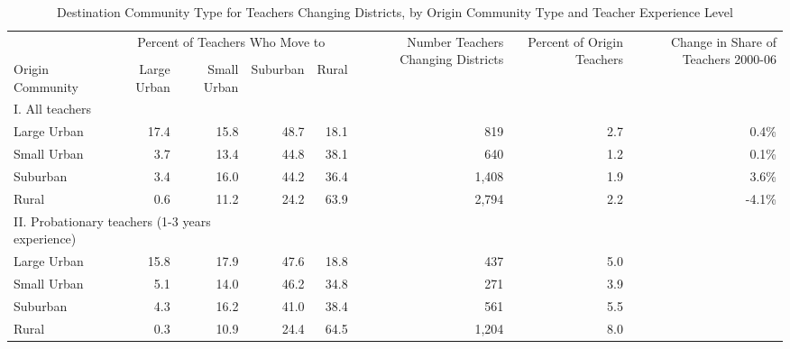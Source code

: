 \documentclass[12pt,]{article}
\begin{document}
\begin{sidewaystable}[htbp]
\centering
\begin{tabular}{lrrrrrrr}
  \hline
 & \multicolumn{4}{c}{\multirow{2}{*}{Percent of Teachers Who Move to}} & \multirow{4}{*}{\parbox{0.09\linewidth}{Number Teachers Changing Districts}} & \multirow{4}{*}{\parbox{0.07\linewidth}{Percent of Origin Teachers}} & \multirow{4}{*}{\parbox{0.09\linewidth}{Change in Share of Teachers 2000-06}}\\
 & \multicolumn{4}{c}{} & & & \\ \cline{2-5}
& & & & & & & \\
Origin Community & Large Urban & Small Urban & Suburban & Rural &  &  &  \\ 
  \hline
I. All teachers & & & & & & & \\
\quad Large Urban & 17.4 & 15.8 & 48.7 & 18.1 & 819 & 2.7 & 0.4\% \\ 
  \quad Small Urban & 3.7 & 13.4 & 44.8 & 38.1 & 640 & 1.2 & 0.1\% \\ 
  \quad Suburban & 3.4 & 16.0 & 44.2 & 36.4 & 1,408 & 1.9 & 3.6\% \\ 
  \quad Rural & 0.6 & 11.2 & 24.2 & 63.9 & 2,794 & 2.2 & -4.1\% \\ 
\multicolumn{3}{l}{II. Probationary teachers (1-3 years experience)} & & & & & \\
  \quad Large Urban & 15.8 & 17.9 & 47.6 & 18.8 & 437 & 5.0 &  \\ 
  \quad Small Urban & 5.1 & 14.0 & 46.2 & 34.8 & 271 & 3.9 &  \\ 
  \quad Suburban & 4.3 & 16.2 & 41.0 & 38.4 & 561 & 5.5 &  \\ 
  \quad Rural & 0.3 & 10.9 & 24.4 & 64.5 & 1,204 & 8.0 &  \\ 
   \hline
\end{tabular}
\caption{Destination Community Type for Teachers Changing Districts, by Origin Community Type and Teacher Experience Level} 
\label{tbl:markov}
\end{sidewaystable}
\end{document}

